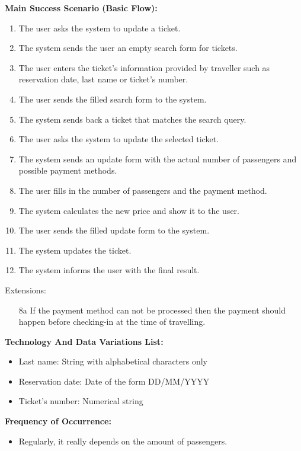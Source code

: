 \textbf{Main Success Scenario (Basic Flow):}
\begin{enumerate}
\item The user asks the system to update a ticket.
\item The system sends the user an empty search form for tickets.
\item The user enters the ticket's information provided by traveller such as reservation date, last name or ticket's number.
\item The user sends the filled search form to the system.
\item The system sends back a ticket that matches the search query.
\item The user asks the system to update the selected ticket.
\item The system sends an update form with the actual number of passengers and possible payment methods.
\item The user fills in the number of passengers and the payment method.
\item The system calculates the new price and show it to the user.
\item The user sends the filled update form to the system.
\item The system updates the ticket.
\item The system informs the user with the final result.
\end{enumerate}
Extensions:
\begin{enumerate}
\item[8a] If the payment method can not be processed then the payment should happen before checking-in at the time of travelling.
\end{enumerate}


\textbf{Technology And Data Variations List:} 
\begin{itemize}
    \item Last name: String with alphabetical characters only
    \item Reservation date: Date of the form DD/MM/YYYY
    \item Ticket's number: Numerical string
    \end{itemize}
\textbf{Frequency of Occurrence:} 
\begin{itemize}
    \item Regularly, it really depends on the amount of passengers.
\end{itemize} 

